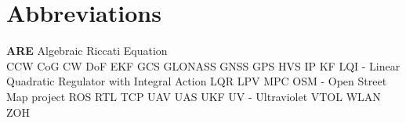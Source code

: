 \chapter*{Abbreviations} \label{abbreviations}

\textbf{ARE} \qquad Algebraic Riccati Equation
\\
CCW
CoG
CW
DoF
EKF
GCS
GLONASS
GNSS
GPS
HVS
IP
KF
LQI - Linear Quadratic Regulator with Integral Action
LQR
LPV
MPC
OSM - Open Street Map project
ROS
RTL
TCP
UAV
UAS
UKF
UV - Ultraviolet
VTOL
WLAN
ZOH